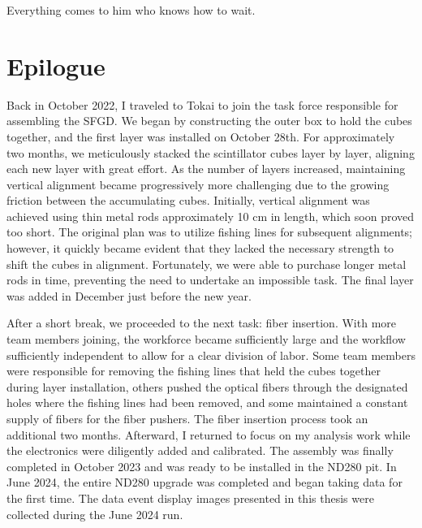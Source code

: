 \begin{savequote}[8cm]
Everything comes to him who knows how to wait.

\end{savequote}

\chapter{\label{ch:concl}Epilogue} 

\minitoc

Back in October 2022, I traveled to Tokai to join the task force responsible for assembling the SFGD.
We began by constructing the outer box to hold the cubes together, and the first layer was installed on October 28th.
For approximately two months, we meticulously stacked the scintillator cubes layer by layer, aligning each new layer with great effort.
As the number of layers increased, maintaining vertical alignment became progressively more challenging due to the growing friction between the accumulating cubes.
Initially, vertical alignment was achieved using thin metal rods approximately 10 cm in length, which soon proved too short.
The original plan was to utilize fishing lines for subsequent alignments; however, it quickly became evident that they lacked the necessary strength to shift the cubes in alignment.
Fortunately, we were able to purchase longer metal rods in time, preventing the need to undertake an impossible task.
The final layer was added in December just before the new year.

After a short break, we proceeded to the next task: fiber insertion.
With more team members joining, the workforce became sufficiently large and the workflow sufficiently independent to allow for a clear division of labor.
Some team members were responsible for removing the fishing lines that held the cubes together during layer installation, others pushed the optical fibers through the designated holes where the fishing lines had been removed, and some maintained a constant supply of fibers for the fiber pushers.
The fiber insertion process took an additional two months.
Afterward, I returned to focus on my analysis work while the electronics were diligently added and calibrated.
The assembly was finally completed in October 2023 and was ready to be installed in the ND280 pit.
In June 2024, the entire ND280 upgrade was completed and began taking data for the first time.
The data event display images presented in this thesis were collected during the June 2024 run.

